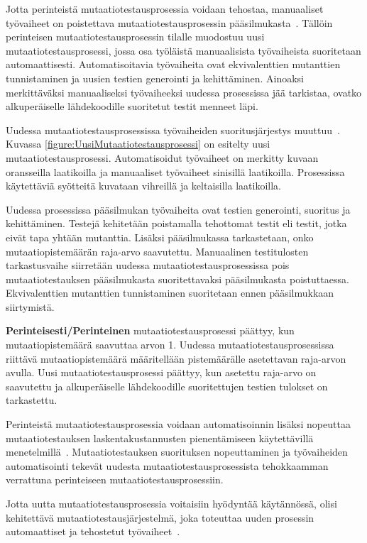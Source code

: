 \documentclass[finnish, grading]{tktltiki2}
\theoremstyle{definition}
\theoremstyle{remark}
\begin{document}
Jotta perinteistä mutaatiotestausprosessia voidaan tehostaa, manuaaliset työvaiheet on poistettava mutaatiotestausprosessin pääsilmukasta~\cite[s. 41]{Offutt:Untch:2001}. Tällöin perinteisen mutaatiotestausprosessin tilalle muodostuu uusi mutaatiotestausprosessi, jossa osa työläistä manuaalisista työvaiheista suoritetaan automaattisesti. Automatisoitavia työvaiheita ovat ekvivalenttien mutanttien tunnistaminen ja uusien testien generointi ja kehittäminen. Ainoaksi merkittäväksi manuaaliseksi työvaiheeksi uudessa prosessissa jää tarkistaa, ovatko alkuperäiselle lähdekoodille suoritetut testit menneet läpi.

Uudessa mutaatiotestausprosessissa työvaiheiden suoritusjärjestys muuttuu~\cite[s. 40]{Offutt:Untch:2001}. Kuvassa \ref{figure:UusiMutaatiotestausprosessi} on esitelty uusi mutaatiotestausprosessi. Automatisoidut työvaiheet on merkitty kuvaan oransseilla laatikoilla ja manuaaliset työvaiheet sinisillä laatikoilla. Prosessissa käytettäviä syötteitä kuvataan vihreillä ja keltaisilla laatikoilla. 

Uudessa prosessissa pääsilmukan työvaiheita ovat testien generointi, suoritus ja kehittäminen. Testejä kehitetään poistamalla tehottomat testit eli testit, jotka eivät tapa yhtään mutanttia. Lisäksi pääsilmukassa tarkastetaan, onko mutaatiopistemäärän raja-arvo saavutettu. Manuaalinen testitulosten tarkastusvaihe siirretään uudessa mutaatiotestausprosessissa pois mutaatiotestauksen pääsilmukasta suoritettavaksi pääsilmukasta poistuttaessa. Ekvivalenttien mutanttien tunnistaminen suoritetaan ennen pääsilmukkaan siirtymistä. 

\textbf{Perinteisesti/Perinteinen} mutaatiotestausprosessi päättyy, kun mutaatiopistemäärä saavuttaa arvon 1. Uudessa mutaatiotestausprosessissa riittävä mutaatiopistemäärä määritellään pistemäärälle asetettavan raja-arvon avulla. Uusi mutaatiotestausprosessi päättyy, kun asetettu raja-arvo on saavutettu ja alkuperäiselle lähdekoodille suoritettujen testien tulokset on tarkastettu.

Perinteistä mutaatiotestausprosessia voidaan automatisoinnin lisäksi nopeuttaa mutaatiotestauksen laskentakustannusten pienentämiseen käytettävillä menetelmillä~\cite[s. 41]{Offutt:Untch:2001}. Mutaatiotestauksen suorituksen nopeuttaminen ja työvaiheiden automatisointi tekevät uudesta mutaatiotestausprosessista tehokkaamman verrattuna perinteiseen mutaatiotestausprosessiin. 

Jotta uutta mutaatiotestausprosessia voitaisiin hyödyntää käytännössä, olisi kehitettävä mutaatiotestausjärjestelmä, joka toteuttaa uuden prosessin automaattiset ja tehostetut työvaiheet~\cite[s. 41-42]{Offutt:Untch:2001}.
\end{document}

